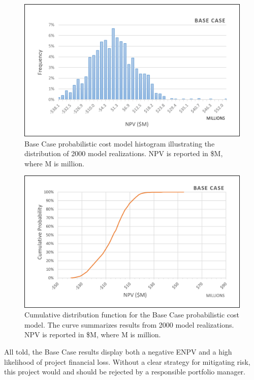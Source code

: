 \begin{figure}[!htp]
\centering
\includegraphics[width=.85\textwidth]{templates/images/Figure-Base_Case_Histogram.png}
\caption[Base Case histogram]{Base Case probabilistic cost model histogram illustrating the distribution of 2000 model realizations. NPV is reported in \$M, where M is million.}
\label{fig:base_case_hist}
\end{figure}

\begin{figure}[!htp]
\centering
\includegraphics[width=.85\textwidth]{templates/images/Figure-Base_Case_CDF.png}
\caption[Base Case CDF]{Cumulative distribution function for the Base Case probabilistic cost model. The curve summarizes results from 2000 model realizations. NPV is reported in \$M, where M is million.}
\label{fig:base_case_cdf}
\end{figure}

All told, the Base Case results display both a negative ENPV and a high likelihood of project financial loss. Without a clear strategy for mitigating risk, this project would and should be rejected by a responsible portfolio manager.
\pagebreak

